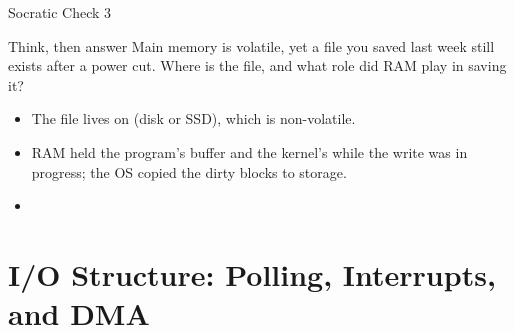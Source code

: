 \documentclass[aspectratio=169]{beamer}
\begin{document}
\begin{frame}{Socratic Check 3}
  \begin{block}{Think, then answer}
    Main memory is volatile, yet a file you saved last week still exists after
    a power cut. Where is the file, and what role did RAM play in saving it?
  \end{block}
  \vspace{0.2cm}
  \begin{itemize}
    \item The file lives on  (disk or SSD), which is
      non-volatile.
    \item RAM held the program's buffer and the kernel's  while the
      write was in progress; the OS copied the dirty blocks to storage.
    \item {}
  \end{itemize}
\end{frame}


\section{I/O Structure: Polling, Interrupts, and DMA}
\end{document}
